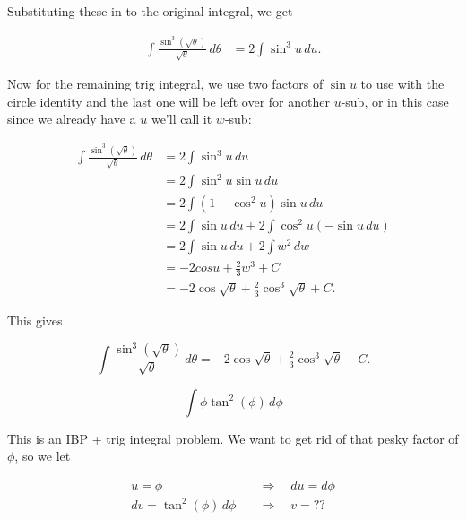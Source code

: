 \documentclass[12pt, letterpaper]{article}
\begin{document}
Substituting these in to the original integral, we get

\begin{equation*}
\begin{aligned}
\int \frac{\sin^3{\left( \sqrt{\theta} \right)}}{\sqrt{\theta}} \, d\theta
  &= 2\int \sin^3{u}\, du.
\end{aligned}
\end{equation*}

Now for the remaining trig integral, we use two factors of $\sin{u}$ to use with the circle identity and the last one will be left over for another $u$-sub, or in this case since we already have a $u$ we'll call it $w$-sub:

\begin{equation*}
\begin{aligned}
\int \frac{\sin^3{\left( \sqrt{\theta} \right)}}{\sqrt{\theta}} \, d\theta
  &= 2\int \sin^3{u}\, du \\[0.2in]
  &= 2\int \sin^2{u}\sin{u} \, du \\[0.2in]
  &= 2\int \left( 1 - \cos^2{u} \right) \sin{u} \, du \\[0.2in]
  &= 2\int \sin{u} \, du + 2\int \cos^2{u} \left( -\sin{u} \, du\right) \\[0.2in]
  &= 2\int \sin{u} \, du + 2\int w^2 \, dw \\[0.2in]
  &= -2cos{u} + \tfrac{2}{3} w^3 + C \\[0.2in]
  &= -2\cos{\sqrt{\theta}} + \tfrac{2}{3}\cos^3{\sqrt{\theta}} + C.
\end{aligned}
\end{equation*}

This gives

\begin{equation*}
\boxed
{
\int \frac{\sin^3{\left( \sqrt{\theta} \right)}}{\sqrt{\theta}} \, d\theta
  = -2\cos{\sqrt{\theta}} + \tfrac{2}{3}\cos^3{\sqrt{\theta}} + C.
}
\end{equation*}


\newpage

$$ \int \phi \tan^2{\left( \phi  \right)} \, d\phi $$

This is an IBP + trig integral problem. We want to get rid of that pesky factor of $\phi$, so we let

\begin{equation*}
\begin{aligned}
u = \phi \quad &\Rightarrow \quad du = d\phi \\
dv = \tan^2{\left( \phi  \right)} \, d\phi \quad &\Rightarrow \quad v = ??
\end{aligned}
\end{equation*}
\end{document}
